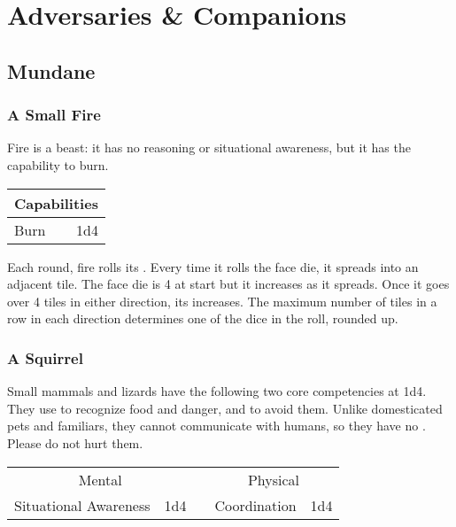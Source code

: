 \documentclass{LegrandOrangeTufteBook}
\begin{document}
\chapterspaceabove{6.75cm}
\chapterspacebelow{11.25cm}


\chapter*{Adversaries \& Companions}

\section*{Mundane}

\subsection*{A Small Fire}

Fire is a beast: it has no reasoning or situational awareness, but it has the capability to burn.
\begin{characterSheet}
	\begin{tabular}{lr|}
		\multicolumn{2}{c}{Capabilities}\\
		\hline
		Burn & 1d4 \\
	\end{tabular}
\end{characterSheet}

Each round, fire rolls its . Every time it rolls the face die,
it spreads into an adjacent tile. The face die is 4 at start but it increases as it spreads.
Once it goes over 4 tiles in either direction, its  increases.
The maximum number of tiles in a row in each direction determines one of the dice in the  roll, rounded up.
\\



\subsection*{A Squirrel}
Small mammals and lizards have the following two core competencies at 1d4.
They use  to recognize food and danger,
and  to avoid them.
Unlike domesticated pets and familiars, they cannot communicate with
humans, so they have no .
Please do not hurt them.\\
\begin{characterSheet}
	\begin{tabular}{lr|clr|}
		\multicolumn{2}{c}{Mental}	&&	\multicolumn{2}{c}{Physical} \\
		\cline{1-2} \cline{4-5}
		Situational Awareness & 1d4				&& 	Coordination & 1d4 \\
	\end{tabular}
\end{characterSheet}
\end{document}
